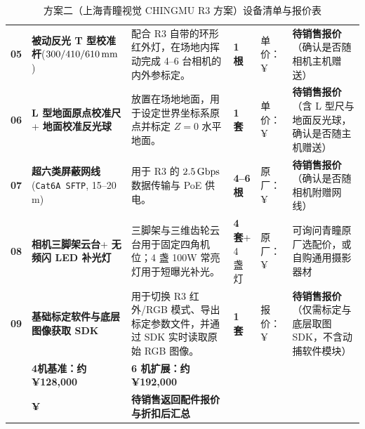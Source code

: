 \documentclass[10pt, a4paper]{ctexart}
\begin{document}
\begin{table}[H]
\begin{tabularx}{\textwidth}{@{} C{0.65cm} L{2.7cm} Y C{1.05cm} L{2.65cm} L{3.55cm} @{}}
\textbf{05} & \textbf{被动反光 T 型校准杆}\newline ($300/410/610\text{\,mm}$) & 配合 R3 自带的环形红外灯，在场地内挥动完成 4--6 台相机的内外参标定。 & \textbf{1 根} & 单价：¥\underline{\hspace{1.35cm}} & \textbf{待销售报价}（确认是否随相机主机赠送） \\
\textbf{06} & \textbf{L 型地面原点校准尺}\newline + \textbf{地面校准反光球} & 放置在场地地面，用于设定世界坐标系原点并标定 $Z=0$ 水平地面。 & \textbf{1 套} & 单价：¥\underline{\hspace{1.35cm}} & \textbf{待销售报价}（含 L 型尺与地面反光球，确认是否随主机赠送） \\
\textbf{07} & \textbf{超六类屏蔽网线}\newline (\texttt{Cat6A SFTP}, 15--20\,m) & 用于 R3 的 $2.5\text{\,Gbps}$ 数据传输与 PoE 供电。 & \textbf{4--6 根} & 原厂：¥\underline{\hspace{1.35cm}} & \textbf{待销售报价}（确认是否随相机附赠网线） \\
\textbf{08} & \textbf{相机三脚架云台}\newline + \textbf{无频闪 LED 补光灯} & 三脚架与三维齿轮云台用于固定四角机位；4 盏 100W 常亮灯用于短曝光补光。 & \textbf{4 套}\newline + 4 盏灯 & 原厂：¥\underline{\hspace{1.35cm}} & 可询问青瞳原厂选配价，或自购通用摄影器材 \\
\textbf{09} & \textbf{基础标定软件与}\newline \textbf{底层图像获取 SDK} & 用于切换 R3 红外/RGB 模式、导出标定参数文件，并通过 SDK 实时读取原始 RGB 图像。 & \textbf{1 套} & 报价：¥\underline{\hspace{1.35cm}} & \textbf{待销售报价}（仅需标定与底层取图 SDK，不含动捕软件模块） \\
\midrule
{}
 & \textbf{\color{WarmAmber}4机基准：约 ¥128,000} & \textbf{6 机扩展：约 ¥192,000} \\
 & \textbf{¥\underline{\hspace{2.1cm}}} & \textbf{待销售返回配件报价与折扣后汇总} \\
\bottomrule
\end{tabularx}
\caption{方案二（上海青瞳视觉 CHINGMU R3 方案）设备清单与报价表}
\label{tab:chingmu_bom}
\end{table}
\end{document}
